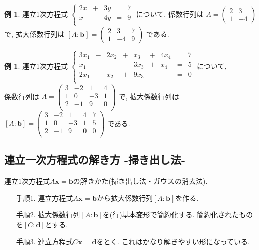 \documentclass[dvipdfmx,a4paper,11pt]{article}
\theoremstyle{definition}
\newtheorem{exa}[thm]{例}
\begin{document}
 \begin{exa}
 連立1次方程式
 $
 \left\{ 
\begin{matrix}
2x&+&3y& = &7 \\
x&-&4y& = &9 \\
\end{matrix}
\right.
 $
 について, 係数行列は
 $A = 
 \begin{pmatrix}
 2 & 3 \\
 1 & -4
 \end{pmatrix}
 $
 で, 拡大係数行列は
 $[A : \bm{b}] = 
  \begin{pmatrix}
 2 & 3  &7\\
 1 & -4 &9
 \end{pmatrix}
 $
 である.
 \end{exa}
 
  \begin{exa}
 連立1次方程式
 $
 \left\{ 
\begin{matrix}
3x_1&-&2x_2& +& x_3 &+& 4x_4 &=& 7 \\
x_1 &  & 	   & -& 3x_3 &+& x_4 &=& 5 \\
2x_1&-& x_2& +& 9x_3 & & 	 &=& 0 \\
\end{matrix}
\right.
 $
 について, \\
 係数行列は
 $A = 
 \begin{pmatrix}
 3 & -2  & 1&4\\
 1 & 0   & -3&1\\
2 & -1  & 9&0\\
 \end{pmatrix}
 $
 で, 拡大係数行列は
 $[A : \bm{b}] = 
 \begin{pmatrix}
 3 & -2  & 1&4 & 7\\
 1 & 0   & -3&1 &5\\
2 & -1  & 9&0 & 0\\
 \end{pmatrix}
 $
 である.
 \end{exa}
 
 \subsection{連立一次方程式の解き方 -掃き出し法-}
 

\begin{tcolorbox}[
    colback = white,
    colframe = green!35!black,
    fonttitle = \bfseries,
    breakable = true]
連立1次方程式$A\bm{x} =\bm{b}$の解きかた(掃き出し法・ガウスの消去法).
 \begin{enumerate}
 	\setlength{\parskip}{0cm}
  	\setlength{\itemsep}{0pt} 
 \item[手順1.] 連立方程式$A\bm{x} =\bm{b}$から拡大係数行列$[A:\bm{b}]$を作る.
 \item[手順2.] 拡大係数行列$[A:\bm{b}]$を(行)基本変形で簡約化する. 簡約化されたものを$[C:\bm{d}]$とする. 
 \item[手順3.] 連立方程式$C\bm{x} =\bm{d}$をとく. これはかなり解きやすい形になっている. 
 \end{enumerate}
 \end{tcolorbox}
 
\end{document}

